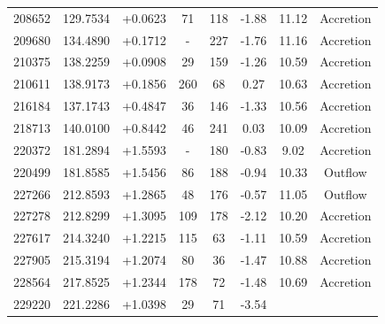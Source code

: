 \documentclass[fleqn,usenatbib]{mnras}
\begin{document}
\begin{table}
\begin{tabular*}{\linewidth}{cccccccc}
208652                    & 129.7534 & +0.0623 & 71                            & 118                         & -1.88%
& 11.12%
& Accretion          \\
209680                    & 134.4890 & +0.1712 & -                           & 227                         & -1.76%
& 11.16%
& Accretion          \\
210375                    & 138.2259 & +0.0908 & 29                            & 159                         & -1.26%
& 10.59%
& Accretion          \\
210611                    & 138.9173 & +0.1856 & 260                           & 68                          & 0.27%
& 10.63%
& Accretion          \\
216184                    & 137.1743 & +0.4847 & 36                            & 146                         & -1.33%
& 10.56%
& Accretion          \\
218713                    & 140.0100 & +0.8442 & 46                            & 241                         & 0.03%
& 10.09%
& Accretion          \\
220372                    & 181.2894 & +1.5593 & -                           & 180                         & -0.83%
& 9.02%
& Accretion          \\
220499                    & 181.8585 & +1.5456 & 86                            & 188                         & -0.94%
& 10.33%
& Outflow            \\
227266                    & 212.8593 & +1.2865 & 48                            & 176                         & -0.57%
& 11.05%
& Outflow            \\
227278                    & 212.8299 & +1.3095 & 109                           & 178                         & -2.12%
& 10.20%
& Accretion          \\
227617                    & 214.3240 & +1.2215 & 115                           & 63                          & -1.11%
& 10.59%
& Accretion          \\
227905                    & 215.3194 & +1.2074 & 80                            & 36                          & -1.47%
& 10.88%
& Accretion          \\
228564                    & 217.8525 & +1.2344 & 178                           & 72                          & -1.48%
& 10.69%
& Accretion          \\
229220                    & 221.2286 & +1.0398 & 29                            & 71                          & -3.54%

\end{tabular*}
\end{table}
\end{document}
